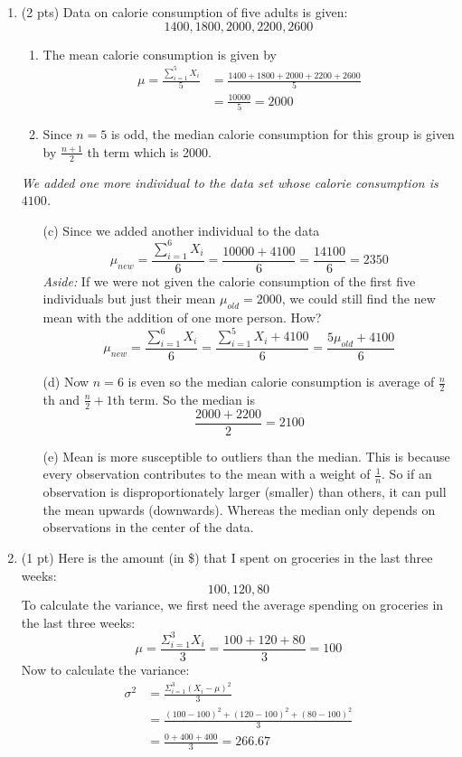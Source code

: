 \documentclass{./../../Latex/handout}
\begin{document}
\begin{enumerate}
\item (2 pts) Data on calorie consumption of five adults is given:
$$ 1400, 1800, 2000, 2200, 2600 $$
\begin{enumerate}
\item The mean calorie consumption is given by 
\begin{align*}
 \mu  = \frac{\sum_{i=1}^5 X_i}{5}  & = \frac{1400+1800+2000+2200+2600}{5} \\
 & = \frac{10000}{5} = 2000 
 \end{align*}
\item Since $n=5$ is odd, the median calorie consumption for this group is given by 
$ \frac{n+1}{2}$ th term which is 2000. 
\end{enumerate}
\textit{We added one more individual to the data set whose calorie consumption is $4100$.}
\begin{enumerate}
\item[(c)] Since we added another individual to the data 
$$  \mu_{new} = \frac{\sum_{i=1}^6 X_i}{6} = \frac{10000+4100}{6} = \frac{14100}{6} = 2350 $$
\textit{Aside:} If we were not given the calorie consumption of the first five individuals but just their mean $\mu_{old} = 2000$, we could still find the new mean with the addition of one more person. How?
$$ \mu_{new} = \frac{\sum_{i=1}^6 X_i}{6} = \frac{\sum_{i=1}^5 X_i + 4100}{6} = \frac{5 \mu_{old}  + 4100}{6}$$ 
\item[(d)]  Now $n=6$ is even so the median calorie consumption is average of $\frac{n}{2}$th and $\frac{n}{2}+1$th term. So the median is 
$$ \frac{2000+2200}{2} = 2100 $$
\item[(e)] Mean is more susceptible to outliers than the median. This is because every observation contributes to the mean with a weight of $\frac{1}{n}$. So if an observation is disproportionately larger (smaller) than others, it can pull the mean upwards (downwards). Whereas the median only depends on observations in the center of the data. 
\end{enumerate}

\item (1 pt) Here is the amount (in \$) that I spent on groceries in the last three weeks: 
$$ 100, 120, 80  $$
To calculate the variance, we first need the average spending on groceries in the last three weeks:
$$ \mu = \frac{\Sigma_{i=1}^3 X_i}{3} = \frac{100+120+80}{3} = 100 $$
Now to calculate the variance:
\begin{align*}
	\sigma^2 &= \frac{\Sigma_{i=1}^3 (X_i-\mu)^2}{3} \\
	&= \frac{(100-100)^2+(120-100)^2+(80-100)^2}{3} \\ 
	&= \frac{0+400+400}{3} = 266.67
\end{align*}


\end{enumerate}
\end{document}
